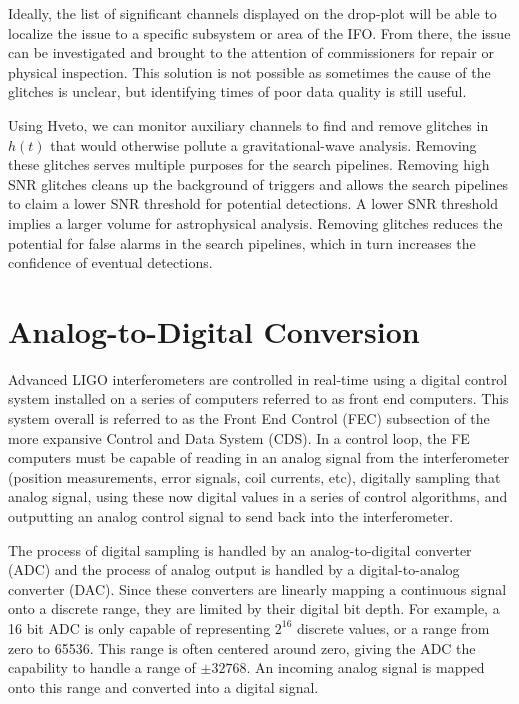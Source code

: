 Ideally, the list of significant channels displayed on the drop-plot will be 
able to localize the issue to a specific subsystem or area of the IFO. 
From there, the issue can be investigated and brought to the attention of 
commissioners for repair or physical inspection. This solution is not possible 
as sometimes the cause of the glitches is unclear, but identifying times of 
poor data quality is still useful.

Using Hveto, we can monitor auxiliary channels to find and remove glitches 
in $h(t)$ that would otherwise pollute a gravitational-wave analysis. Removing 
these glitches serves multiple purposes for the search pipelines. Removing 
high SNR glitches cleans up the background of triggers and allows the search 
pipelines to claim a lower SNR threshold for potential detections. A lower 
SNR threshold implies a larger volume for astrophysical analysis. Removing 
glitches reduces the potential for false alarms in the search pipelines, 
which in turn increases the confidence of eventual detections.


\section{Analog-to-Digital Conversion}

Advanced LIGO interferometers are controlled in real-time using a digital 
control system installed on a series of computers referred to as front end 
computers.  This system overall is referred to as the Front End Control 
(FEC) subsection of the more expansive Control and Data System (CDS).  
In a control loop, the FE computers must be capable of reading in an 
analog signal from the interferometer (position measurements, error signals, 
coil currents, etc), digitally sampling that analog signal, using these now 
digital values in a series of control algorithms, and outputting an analog 
control signal to send back into the interferometer.

The process of digital sampling is handled by an analog-to-digital 
converter (ADC) and the process of analog output is handled by a 
digital-to-analog converter (DAC).  Since these converters are linearly 
mapping a continuous signal onto a discrete range, they are limited by 
their digital bit depth.  For example, a 16 bit ADC is only capable of 
representing $2^{16}$ discrete values, or a range from zero to 65536.  
This range is often centered around zero, giving the ADC the capability 
to handle a range of $\pm32768$.  An incoming analog signal is mapped 
onto this range and converted into a digital signal.

